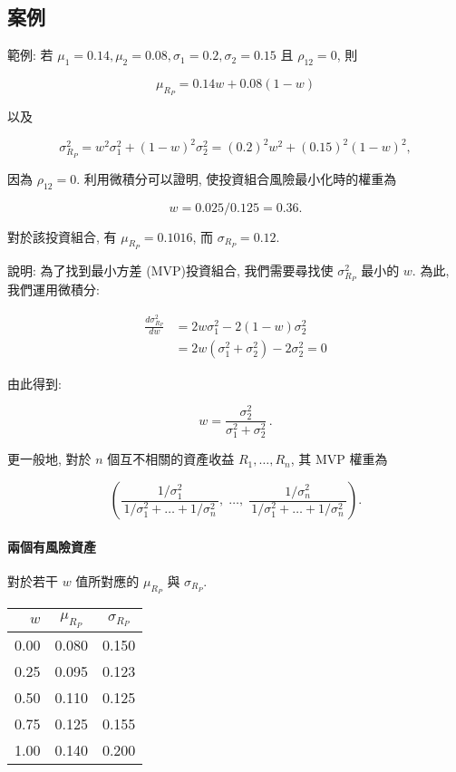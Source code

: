 \documentclass[letterpaper]{article}
\begin{document}
		\subsection{案例}
		範例: 若 $\mu_{1}=0.14, \mu_{2}=0.08, \sigma_{1}=0.2, \sigma_{2}=0.15$ 且 $\rho_{12}=0$, 則  
		
		$$
		\mu_{R_{P}}=0.14w+0.08 (1-w)
		$$
		
		以及  
		
		$$
		\sigma_{R_{P}}^{2}=w^{2}\sigma_{1}^{2}+ (1-w)^{2}\sigma_{2}^{2} 
		= (0.2)^{2}w^{2}+ (0.15)^{2} (1-w)^{2}, 
		$$  
		
		因為 $\rho_{12}=0$. 利用微積分可以證明, 使投資組合風險最小化時的權重為  
		
		$$
		w=0.025/0.125=0.36. 
		$$  
		
		對於該投資組合, 有 $\mu_{R_{P}}=0.1016$, 而 $\sigma_{R_{P}}=0.12$. 
		
		說明: 為了找到最小方差 (MVP)投資組合, 我們需要尋找使 $\sigma_{R_{P}}^{2}$ 最小的 $w$. 為此, 我們運用微積分: 
		
		$$
		\begin{aligned}
			\frac{d \sigma_{R_{P}}^{2}}{d w} & = 2w \sigma_{1}^{2} - 2 (1-w)\sigma_{2}^{2} \\
			& = 2w\left (\sigma_{1}^{2} + \sigma_{2}^{2}\right) - 2\sigma_{2}^{2} = 0
		\end{aligned}
		$$
		
		由此得到:
		
		$$
		w = \frac{\sigma_{2}^{2}}{\sigma_{1}^{2} + \sigma_{2}^{2}} \, .
		$$
		
		更一般地, 對於 $n$ 個互不相關的資產收益 $R_{1}, \ldots, R_{n}$, 其 MVP 權重為
		
		$$
		\left (
		\frac{1/\sigma_{1}^{2}}{\, 1/\sigma_{1}^{2} + \ldots + 1/\sigma_{n}^{2}\, }, \;
		\ldots, \;
		\frac{1/\sigma_{n}^{2}}{\, 1/\sigma_{1}^{2} + \ldots + 1/\sigma_{n}^{2}\, }
		\right).
		$$
		
		\paragraph{兩個有風險資產}
		對於若干 $w$ 值所對應的 $\mu_{R_{P}}$ 與 $\sigma_{R_{P}}$. 
		
		\begin{center}
			\begin{tabular}{rcc}
				$w$ & $\mu_{R_{P}}$ & $\sigma_{R_{P}}$ \\
				\hline
				0.00 & 0.080 & 0.150 \\
				0.25 & 0.095 & 0.123 \\
				0.50 & 0.110 & 0.125 \\
				0.75 & 0.125 & 0.155 \\
				1.00 & 0.140 & 0.200 \\
			\end{tabular}
		\end{center}
		
\end{document}
